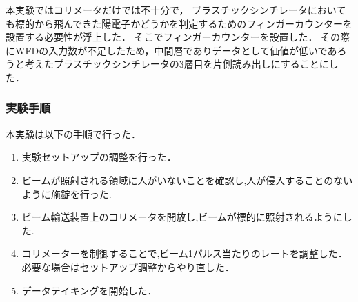 本実験ではコリメータだけでは不十分で，
プラスチックシンチレータにおいても標的から飛んできた陽電子かどうかを判定するためのフィンガーカウンターを設置する必要性が浮上した．
そこでフィンガーカウンターを設置した．
その際にWFDの入力数が不足したため，中間層でありデータとして価値が低いであろうと考えたプラスチックシンチレータの3層目を片側読み出しにすることにした．

\subsubsection{実験手順}
本実験は以下の手順で行った．
\begin{enumerate}
  \item 実験セットアップの調整を行った．
  \item ビームが照射される領域に人がいないことを確認し,人が侵入することのないように施錠を行った.
  \item ビーム輸送装置上のコリメータを開放し,ビームが標的に照射されるようにした.
  \item コリメーターを制御することで,ビーム1パルス当たりのレートを調整した．
    \\必要な場合はセットアップ調整からやり直した．
  \item データテイキングを開始した．
\end{enumerate}
%
